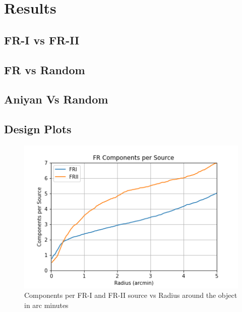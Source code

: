 \documentclass{article}
\begin{document}
\section{Results}

\subsection{\label{sec:level2}FR-I vs FR-II}


\subsection{\label{sec:level2}FR vs Random}


\subsection{\label{sec:level2}Aniyan Vs Random}


\subsection{\label{sec:level2}Design Plots}

\begin{figure}
\centering
\includegraphics[width=0.5\linewidth]{component_per_source.png}
\caption{Components per FR-I and FR-II source vs Radius around the object in arc minutes}
\label{fig:node}
\end{figure}
\end{document}
